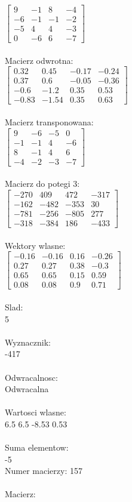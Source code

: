 \documentclass[a4paper,12pt]{article}
\begin{document}
$\begin{bmatrix} 9&-1&8&-4\\-6&-1&-1&-2\\-5&4&4&-3\\0&-6&6&-7 \end{bmatrix}$
\\
\\
Macierz odwrotna:\\

$\begin{bmatrix} 0.32&0.45&-0.17&-0.24\\0.37&0.6&-0.05&-0.36\\-0.6&-1.2&0.35&0.53\\-0.83&-1.54&0.35&0.63 \end{bmatrix}$
\\
\\
Macierz transponowana:\\

$\begin{bmatrix} 9&-6&-5&0\\-1&-1&4&-6\\8&-1&4&6\\-4&-2&-3&-7 \end{bmatrix}$
\\
\\
Macierz do potegi 3:\\

$\begin{bmatrix} -270&409&472&-317\\-162&-482&-353&30\\-781&-256&-805&277\\-318&-384&186&-433 \end{bmatrix}$
\\
\\
Wektory wlasne:\\

$\begin{bmatrix} -0.16&-0.16&0.16&-0.26\\0.27&0.27&0.38&-0.3\\0.65&0.65&0.15&0.59\\0.08&0.08&0.9&0.71 \end{bmatrix}$
\\
\\
Slad:\\
5
\\
\\
Wyznacznik:\\
-417
\\
\\
Odwracalnosc:\\
Odwracalna
\\
\\
Wartosci wlasne:\\
6.5 6.5 -8.53 0.53
\\
\\
Suma elementow:\\
-5
\\
\newpage
Numer macierzy:
157
\\
\\
Macierz:\\
\end{document}
